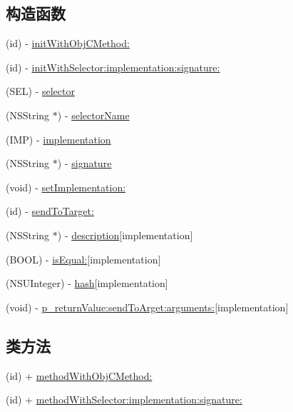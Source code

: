 \subsection*{构造函数}
\begin{DoxyCompactItemize}
\item 
(id) -\/ \hyperlink{interface_m_a_r_method_ab44ba877c685d0c3fe43cacf2a573c92}{init\+With\+Obj\+C\+Method\+:}
\item 
(id) -\/ \hyperlink{interface_m_a_r_method_a306ebba741c2c850ae096b6d148cfe0e}{init\+With\+Selector\+:implementation\+:signature\+:}
\item 
(S\+EL) -\/ \hyperlink{interface_m_a_r_method_a7f6933667f10c7a93cfc392cf75bb46b}{selector}
\item 
(N\+S\+String $\ast$) -\/ \hyperlink{interface_m_a_r_method_a085d3384e7f4ddcf669370e7cdbd922b}{selector\+Name}
\item 
(I\+MP) -\/ \hyperlink{interface_m_a_r_method_a64b5a4d139de5b478d368fa532f981c7}{implementation}
\item 
(N\+S\+String $\ast$) -\/ \hyperlink{interface_m_a_r_method_a95142a29169eb3b6d4b3c5e8d0db54a5}{signature}
\item 
(void) -\/ \hyperlink{interface_m_a_r_method_abf38fb96f245938c1454e40cd35db130}{set\+Implementation\+:}
\item 
(id) -\/ \hyperlink{interface_m_a_r_method_ab333674bc483732ef27e9e9c905631df}{send\+To\+Target\+:}
\item 
(N\+S\+String $\ast$) -\/ \hyperlink{interface_m_a_r_method_a7444b859438c35fb61eea3c6e43ec0aa}{description}{\ttfamily  \mbox{[}implementation\mbox{]}}
\item 
(B\+O\+OL) -\/ \hyperlink{interface_m_a_r_method_a8b3b8ad8f0eea4f914810472a3aaf024}{is\+Equal\+:}{\ttfamily  \mbox{[}implementation\mbox{]}}
\item 
(N\+S\+U\+Integer) -\/ \hyperlink{interface_m_a_r_method_af5182ffd18f37fce598b274d6f6d8247}{hash}{\ttfamily  \mbox{[}implementation\mbox{]}}
\item 
(void) -\/ \hyperlink{interface_m_a_r_method_aef48254a78196c3b15b6ec131902637d}{p\+\_\+return\+Value\+:send\+To\+Arget\+:arguments\+:}{\ttfamily  \mbox{[}implementation\mbox{]}}
\end{DoxyCompactItemize}
\subsection*{类方法}
\begin{DoxyCompactItemize}
\item 
(id) + \hyperlink{interface_m_a_r_method_a1d963feaafa881ce250357d5f9e61ee5}{method\+With\+Obj\+C\+Method\+:}
\item 
(id) + \hyperlink{interface_m_a_r_method_a88e1c4837934f4ae54e16ea1da4fcaee}{method\+With\+Selector\+:implementation\+:signature\+:}
\end{DoxyCompactItemize}


